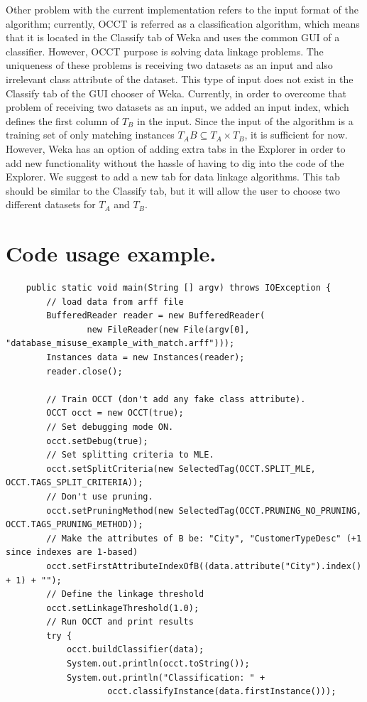 \documentclass[a4paper,12pt]{article}
\begin{document}
\begin{spacing}{1.5}
Other problem with the current implementation refers to the input format of the algorithm; currently, OCCT is referred as a classification algorithm, which means that it is located in the Classify tab of Weka and uses the common GUI of a classifier. However, OCCT purpose is solving data linkage problems. The uniqueness of these problems is receiving two datasets as an input and also irrelevant class attribute of the dataset. This type of input does not exist in the Classify tab of the GUI chooser of Weka. Currently, in order to overcome that problem of receiving two datasets as an input, we added an input index, which defines the first column of $T_B$ in the input. Since the input of the algorithm is a training set of only matching instances $T_AB \subseteq T_A \times T_B$, it is sufficient for now. However, Weka has an option of adding extra tabs in the Explorer in order to add new functionality without the hassle of having to dig into the code of the Explorer. We suggest to add a new tab for data linkage algorithms. This tab should be similar to the Classify tab, but it will allow the user to choose two different datasets for $T_A$ and $T_B$.





\clearpage
\section{Code usage example.}
\begin{lstlisting}
	public static void main(String [] argv) throws IOException {
		// load data from arff file
		BufferedReader reader = new BufferedReader(
				new FileReader(new File(argv[0], "database_misuse_example_with_match.arff")));
		Instances data = new Instances(reader);
		reader.close();

        // Train OCCT (don't add any fake class attribute).
		OCCT occt = new OCCT(true);
        // Set debugging mode ON.
		occt.setDebug(true);
        // Set splitting criteria to MLE.
        occt.setSplitCriteria(new SelectedTag(OCCT.SPLIT_MLE, OCCT.TAGS_SPLIT_CRITERIA));
        // Don't use pruning.
        occt.setPruningMethod(new SelectedTag(OCCT.PRUNING_NO_PRUNING, OCCT.TAGS_PRUNING_METHOD));
        // Make the attributes of B be: "City", "CustomerTypeDesc" (+1 since indexes are 1-based)
		occt.setFirstAttributeIndexOfB((data.attribute("City").index() + 1) + "");
        // Define the linkage threshold
		occt.setLinkageThreshold(1.0);
        // Run OCCT and print results
        try {
			occt.buildClassifier(data);
			System.out.println(occt.toString());
			System.out.println("Classification: " +
					occt.classifyInstance(data.firstInstance()));


\end{lstlisting}
\end{spacing}
\end{document}
